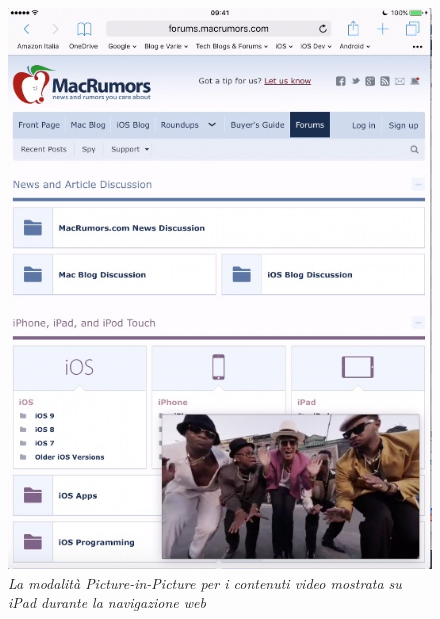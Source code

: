 \begin{figure}[H]
      \centering
      \includegraphics[scale=0.70]{immagini/app_video.jpg}
            \vspace{0.8cm}
            \caption{\textit{La modalità Picture-in-Picture per i contenuti video mostrata su iPad durante la navigazione web}}
\end{figure}
